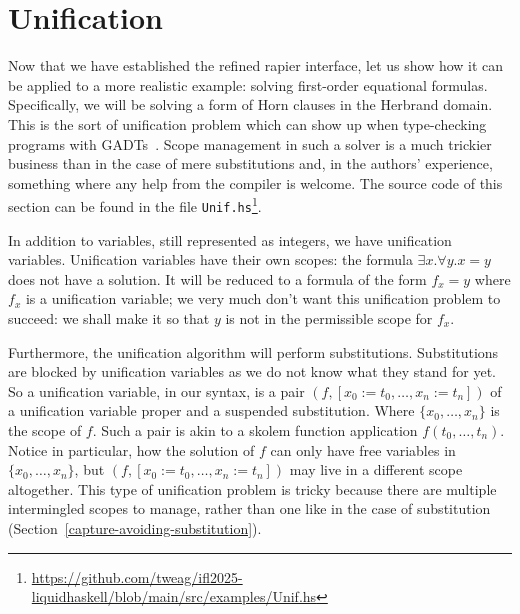 \documentclass[sigconf]{acmart}
\newcommand{\tc}[1]{{\small\texttt{#1}}}
\newcommand{\sourcefile}[1]{\tc{#1}\footnote{\scriptsize\url{https://github.com/tweag/ifl2025-liquidhaskell/blob/main/src/examples/#1}}}
\begin{document}




\section{Unification}
\label{unification}

Now that we have established the refined rapier interface, let us show how it
can be applied to a more realistic example: solving first-order equational
formulas. Specifically, we will be solving a form of Horn clauses in
the Herbrand domain. This is the sort of unification problem which can show up
when type-checking programs with GADTs~\cite{schrijvers09}. Scope management in
such a solver is a much trickier business than in the case of mere substitutions
and, in the authors' experience, something where any help from the compiler is welcome.
The source code of this section can be found in the file
\sourcefile{Unif.hs}.

In addition to variables, still represented as integers, we have unification
variables. Unification variables have their own scopes: the formula
$\exists x. \forall y. x=y$ does not have a solution. It will be reduced to a
formula of the form $f_{x} = y$ where $f_{x}$ is a unification variable; we very much
don't want this unification problem to succeed: we shall make it so that $y$ is not in
the permissible scope for $f_{x}$.

Furthermore, the unification algorithm will perform substitutions. Substitutions are blocked by
unification variables as we do not know what they stand for yet. So a unification
variable, in our syntax, is a pair $(f, [x_0:=t_0,\ldots,x_n:=t_n])$ of a
unification variable proper and a suspended substitution. Where
$\{x_0,\ldots,x_{n}\}$ is the scope of $f$. Such a pair is akin to a skolem
function application $f(t_0,\ldots,t_n)$. Notice in particular, how the solution
of $f$ can only have free variables in $\{x_0,\ldots,x_{n}\}$, but
$(f, [x_0:=t_0,\ldots,x_n:=t_n])$ may live in a different scope altogether.
This type of unification problem is tricky because there are multiple
intermingled scopes to manage, rather than one like
in the case of substitution (Section~\ref{capture-avoiding-substitution}).
\end{document}

